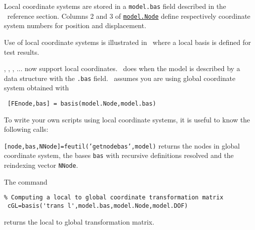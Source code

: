 Local coordinate systems are stored in a {\tt model.bas} field described in the \basis\ reference section. Columns 2 and 3 of \hyperlink{node}{{\tt model.Node}} define respectively coordinate system numbers for position and displacement. 

\begin{SDT}
Use of local coordinate systems is illustrated in~ where a local basis is defined for test results.
\end{SDT}

\feplot, \femk, \rigid, ... now support local coordinates. \feutil\ does when the model is described by a data structure with the {\tt .bas} field. \femesh\ assumes you are using global coordinate system obtained with

\begin{verbatim}
 [FEnode,bas] = basis(model.Node,model.bas)
\end{verbatim}


To write your own scripts using local coordinate systems, it is useful to know the following calls:

{\tt [node,bas,NNode]=feutil('getnodebas',model)} returns the nodes in global coordinate system, the bases {\tt bas} with recursive definitions resolved and the reindexing vector {\tt NNode}. 

The command
\begin{verbatim}
% Computing a local to global coordinate transformation matrix
 cGL=basis('trans l',model.bas,model.Node,model.DOF)
\end{verbatim}


returns the local to global transformation matrix.








